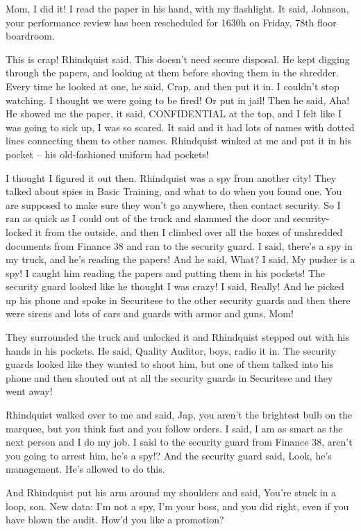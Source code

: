 Mom, I did it! I read the paper in his hand, with my flashlight. It 
said, Johnson, your performance review has been rescheduled for 1630h 
on Friday, 78th floor boardroom.

This is crap! Rhindquist said. This doesn't need secure disposal. He 
kept digging through the papers, and looking at them before shoving 
them in the shredder. Every time he looked at one, he said, Crap, and 
then put it in. I couldn't stop watching. I thought we were going to be 
fired! Or put in jail! Then he said, Aha! He showed me the paper, it 
said, CONFIDENTIAL at the top, and I felt like I was going to sick up, 
I was so scared. It said 
and it had lots of names with 
dotted lines connecting them to other names. Rhindquist winked at me 
and put it in his pocket -- his old-fashioned uniform had pockets!

I thought I figured it out then. Rhindquist was a spy from another 
city! They talked about spies in Basic Training, and what to do when 
you found one. You are supposed to make sure they won't go anywhere, 
then contact security. So I ran as quick as I could out of the truck 
and slammed the door and security-locked it from the outside, and then 
I climbed over all the boxes of unshredded documents from Finance 38 
and ran to the security guard. I said, there's a spy in my truck, and 
he's reading the papers! And he said, What? I said, My pusher is a spy! 
I caught him reading the papers and putting them in his pockets! The 
security guard looked like he thought I was crazy! I said, Really! And 
he picked up his phone and spoke in Securitese to the other security 
guards and then there were sirens and lots of cars and guards with 
armor and guns, Mom!

They surrounded the truck and unlocked it and Rhindquist stepped out 
with his hands in his pockets. He said, Quality Auditor, boys, radio it 
in. The security guards looked like they wanted to shoot him, but one 
of them talked into his phone and then shouted out at all the security 
guards in Securitese and they went away!

Rhindquist walked over to me and said, Jap, you aren't the brightest 
bulb on the marquee, but you think fast and you follow orders. I said, 
I am as smart as the next person and I do my job. I said to the 
security guard from Finance 38, aren't you going to arrest him, he's a 
spy!? And the security guard said, Look, he's management. He's allowed 
to do this.

And Rhindquist put his arm around my shoulders and said, You're stuck 
in a loop, son. New data: I'm not a spy, I'm your boss, and you did 
right, even if you have blown the audit. How'd you like a promotion?

